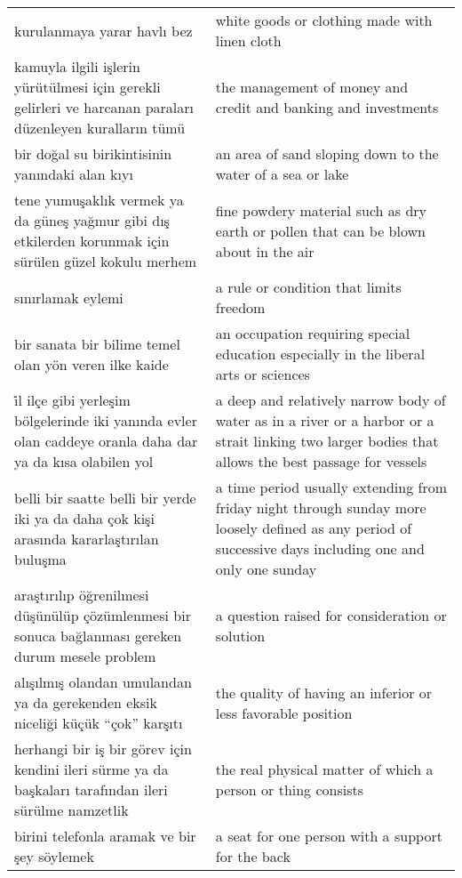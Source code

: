 \begin{longtable}{p{} p{}}
    \cmidrule(rl){1-2}
    kurulanmaya yarar havlı bez & white goods or clothing made with linen cloth \\
    \cmidrule(rl){1-2}
    kamuyla ilgili işlerin yürütülmesi için gerekli gelirleri ve harcanan paraları düzenleyen kuralların tümü & the management of money and credit and banking and investments \\
    \cmidrule(rl){1-2}
    bir doğal su birikintisinin yanındaki alan kıyı & an area of sand sloping down to the water of a sea or lake \\
    \cmidrule(rl){1-2}
    tene yumuşaklık vermek ya da güneş yağmur gibi dış etkilerden korunmak için sürülen güzel kokulu merhem & fine powdery material such as dry earth or pollen that can be blown about in the air \\
    \cmidrule(rl){1-2}
    sınırlamak eylemi & a rule or condition that limits freedom \\
    \cmidrule(rl){1-2}
    bir sanata bir bilime temel olan yön veren ilke kaide & an occupation requiring special education especially in the liberal arts or sciences \\
    \cmidrule(rl){1-2}
    i̇l ilçe gibi yerleşim bölgelerinde iki yanında evler olan caddeye oranla  daha dar ya da kısa olabilen yol & a deep and relatively narrow body of water as in a river or a harbor or a strait linking two larger bodies that allows the best passage for vessels \\
    \cmidrule(rl){1-2}
    belli bir saatte belli bir yerde iki ya da daha çok kişi arasında kararlaştırılan  buluşma & a time period usually extending from friday night through sunday more loosely defined as any period of successive days including one and only one sunday \\
    \cmidrule(rl){1-2}
    araştırılıp öğrenilmesi düşünülüp çözümlenmesi bir sonuca bağlanması gereken durum mesele problem & a question raised for consideration or solution \\
    \cmidrule(rl){1-2}
    alışılmış olandan umulandan ya da gerekenden eksik niceliği küçük “çok” karşıtı & the quality of having an inferior or less favorable position \\
    \cmidrule(rl){1-2}
    herhangi bir iş bir görev için kendini ileri sürme ya da başkaları tarafından ileri sürülme namzetlik & the real physical matter of which a person or thing consists \\
    \cmidrule(rl){1-2}
    birini telefonla aramak ve bir şey söylemek & a seat for one person with a support for the back \\

\end{longtable}

